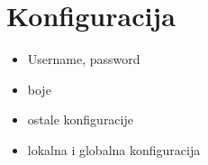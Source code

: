 \chapter*{Konfiguracija}

\begin{itemize}
   \item Username, password
   \item boje
   \item ostale konfiguracije
   \item lokalna i globalna konfiguracija
\end{itemize}


